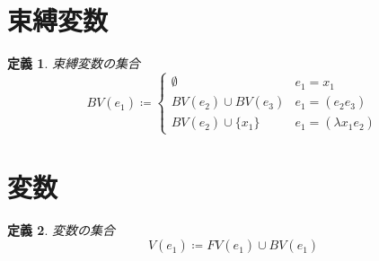 \documentclass{ltjsbook}%
\newtheorem{definition}{定義}[section]%
\begin{document}
\section{束縛変数}%
\label{untyped:bv}%
\begin{definition}%
束縛変数の集合%
\begin{equation}%
  BV(\mathit{e}_1^{}) \coloneqq \begin{cases}%
    \emptyset & \mathit{e}_1^{} = \mathit{x}_1^{}\\%
    BV(\mathit{e}_2^{})\cup BV(\mathit{e}_3^{})%
    & \mathit{e}_1^{} = (\mathit{e}_2^{}\mathit{e}_3^{})\\%
    BV(\mathit{e}_2^{})\cup\{\mathit{x}_1^{}\}%
    & \mathit{e}_1^{} = (\lambda\mathit{x}_1^{}\mathit{e}_2^{})%
  \end{cases}%
\end{equation}%
\end{definition}%
\section{変数}%
\label{untyped:v}%
\begin{definition}%
変数の集合%
\begin{equation}%
  V(\mathit{e}_1^{}) \coloneqq FV(\mathit{e}_1^{})\cup BV(\mathit{e}_1^{})%
\end{equation}%
\end{definition}%
\end{document}
